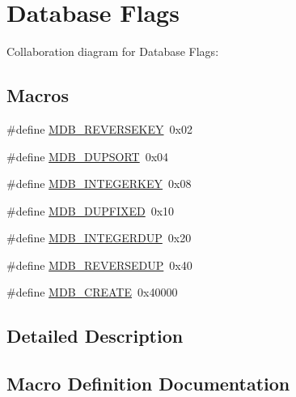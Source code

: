 \hypertarget{group__mdb__dbi__open}{}\section{Database Flags}
\label{group__mdb__dbi__open}
Collaboration diagram for Database Flags\+:
\subsection*{Macros}
\begin{DoxyCompactItemize}
\item 
\#define \mbox{\hyperlink{group__mdb__dbi__open_gaea2d873575b7875771ea5296b4c85beb}{M\+D\+B\+\_\+\+R\+E\+V\+E\+R\+S\+E\+K\+EY}}~0x02
\item 
\#define \mbox{\hyperlink{group__mdb__dbi__open_gae0626566c2562e9007f5c8c9535bab1a}{M\+D\+B\+\_\+\+D\+U\+P\+S\+O\+RT}}~0x04
\item 
\#define \mbox{\hyperlink{group__mdb__dbi__open_ga219c5c50d41902fca79c68d8836e7753}{M\+D\+B\+\_\+\+I\+N\+T\+E\+G\+E\+R\+K\+EY}}~0x08
\item 
\#define \mbox{\hyperlink{group__mdb__dbi__open_ga5acc26f80668d1ebc31265d178c69338}{M\+D\+B\+\_\+\+D\+U\+P\+F\+I\+X\+ED}}~0x10
\item 
\#define \mbox{\hyperlink{group__mdb__dbi__open_gad9b1b4e231bf2e4fa8d7f90be8ba2765}{M\+D\+B\+\_\+\+I\+N\+T\+E\+G\+E\+R\+D\+UP}}~0x20
\item 
\#define \mbox{\hyperlink{group__mdb__dbi__open_gaf99ce592b75d65e23503f78a7933c297}{M\+D\+B\+\_\+\+R\+E\+V\+E\+R\+S\+E\+D\+UP}}~0x40
\item 
\#define \mbox{\hyperlink{group__mdb__dbi__open_gafd47620cff55fb3ec7cd7501d4d1cb4a}{M\+D\+B\+\_\+\+C\+R\+E\+A\+TE}}~0x40000
\end{DoxyCompactItemize}


\subsection{Detailed Description}


\subsection{Macro Definition Documentation}
\mbox{\label{group__mdb__dbi__open_gafd47620cff55fb3ec7cd7501d4d1cb4a}} 
